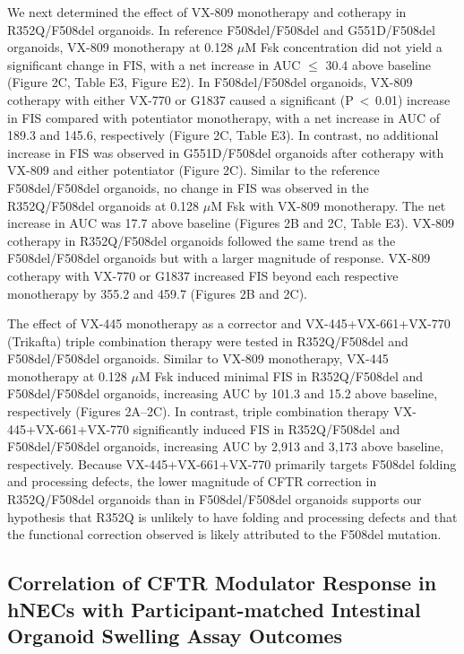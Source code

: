 We next determined the effect of VX-809 monotherapy and cotherapy in R352Q/F508del organoids. In reference F508del/F508del and G551D/F508del organoids, VX-809 monotherapy at 0.128 $\mu$M Fsk concentration did not yield a significant change in FIS, with a net increase in AUC $\leq$ 30.4 above baseline (Figure 2C, Table E3, Figure E2). In F508del/F508del organoids, VX-809 cotherapy with either VX-770 or G1837 caused a significant (P $<$ 0.01) increase in FIS compared with potentiator monotherapy, with a net increase in AUC of 189.3 and 145.6, respectively (Figure 2C, Table E3). In contrast, no additional increase in FIS was observed in G551D/F508del organoids after cotherapy with VX-809 and either potentiator (Figure 2C). Similar to the reference F508del/F508del organoids, no change in FIS was observed in the R352Q/F508del organoids at 0.128 $\mu$M Fsk with VX-809 monotherapy. The net increase in AUC was 17.7 above baseline (Figures 2B and 2C, Table E3). VX-809 cotherapy in R352Q/F508del organoids followed the same trend as the F508del/F508del organoids but with a larger magnitude of response. VX-809 cotherapy with VX-770 or G1837 increased FIS beyond each respective monotherapy by 355.2 and 459.7 (Figures 2B and 2C).

The effect of VX-445 monotherapy as a corrector and VX-445+VX-661+VX-770 (Trikafta) triple combination therapy were tested in R352Q/F508del and F508del/F508del organoids. Similar to VX-809 monotherapy, VX-445 monotherapy at 0.128 $\mu$M Fsk induced minimal FIS in R352Q/F508del and F508del/F508del organoids, increasing AUC by 101.3 and 15.2 above baseline, respectively (Figures 2A–2C). In contrast, triple combination therapy VX-445+VX-661+VX-770 significantly induced FIS in R352Q/F508del and F508del/F508del organoids, increasing AUC by 2,913 and 3,173 above baseline, respectively. Because VX-445+VX-661+VX-770 primarily targets F508del folding and processing defects, the lower magnitude of CFTR correction in R352Q/F508del organoids than in F508del/F508del organoids supports our hypothesis that R352Q is unlikely to have folding and processing defects and that the functional correction observed is likely attributed to the F508del mutation.

\subsection{Correlation of CFTR Modulator Response in hNECs with Participant-matched Intestinal Organoid Swelling Assay Outcomes}

